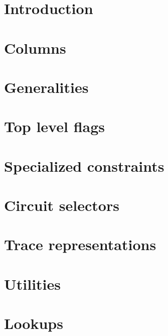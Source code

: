 \section{Introduction                        \lispNone{}}    \label{bls: intro}                      
\section{Columns                             }    \label{bls: columns}                     %
\section{Generalities                        }    \label{bls: generalities}                %
\section{Top level flags \locTopLevelFlags{} }    \label{bls: top level}                   %
\section{Specialized constraints             }    \label{bls: specialized constraints}     %
\section{Circuit selectors                   }    \label{bls: circuit selectors}           %
\section{Trace representations               }    \label{bls: trace representations}       %
\section{Utilities                           }    \label{bls: utilities}                   %
\section{Lookups                             }    \label{bls: lookups}                     %
